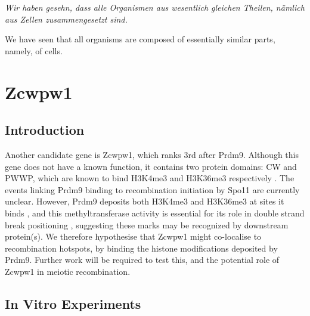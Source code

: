 \begin{savequote}[8cm]
\textit{Wir haben gesehn, dass alle Organismen aus wesentlich gleichen Theilen, nämlich aus Zellen zusammengesetzt sind.}

We have seen that all organisms are composed of essentially similar parts, namely, of cells.
\end{savequote}

\chapter{\label{ch:3-Zcw} Zcwpw1}

\minitoc

\section{Introduction}


Another candidate gene is Zcwpw1, which ranks 3rd after Prdm9. Although this gene does not have a known function, it contains two protein domains: CW and PWWP, which are known to bind H3K4me3 and H3K36me3 respectively \cite{He2010Complex, Rona2016PWWP}. The events linking Prdm9 binding to recombination initiation by Spo11 are currently unclear. However, Prdm9 deposits both H3K4me3 and H3K36me3 at sites it binds \cite{Powers2016Meiotic}, and this methyltransferase activity is essential for its role in double strand break positioning \cite{Diagouraga2018PRDM9}, suggesting these marks may be recognized by downstream protein(s). We therefore hypothesise that Zcwpw1 might co-localise to recombination hotspots, by binding the histone modifications deposited by Prdm9. Further work will be required to test this, and the potential role of Zcwpw1 in meiotic recombination.

\section{In Vitro Experiments}

